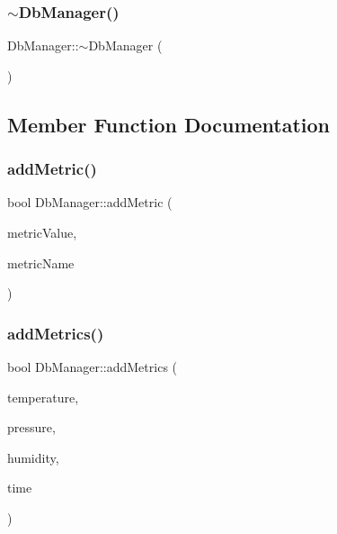 \mbox{\label{class_db_manager_ac5cdf8e5e932d1681ab807d8f256374c}} 
\subsubsection{\texorpdfstring{$\sim$\+Db\+Manager()}{~DbManager()}}
{\footnotesize\ttfamily Db\+Manager\+::$\sim$\+Db\+Manager (\begin{DoxyParamCaption}{ }\end{DoxyParamCaption})}



\subsection{Member Function Documentation}
\mbox{\label{class_db_manager_aec06961d5c5f828bddca53d57b1783c6}} 
\subsubsection{\texorpdfstring{add\+Metric()}{addMetric()}}
{\footnotesize\ttfamily bool Db\+Manager\+::add\+Metric (\begin{DoxyParamCaption}\item[{Q\+String}]{metric\+Value,  }\item[{Q\+String}]{metric\+Name }\end{DoxyParamCaption})}

\mbox{\label{class_db_manager_ac428e3219240fa0432d9b2a037d1d00c}} 
\subsubsection{\texorpdfstring{add\+Metrics()}{addMetrics()}}
{\footnotesize\ttfamily bool Db\+Manager\+::add\+Metrics (\begin{DoxyParamCaption}\item[{Q\+String}]{temperature,  }\item[{Q\+String}]{pressure,  }\item[{Q\+String}]{humidity,  }\item[{Q\+String}]{time }\end{DoxyParamCaption})}

